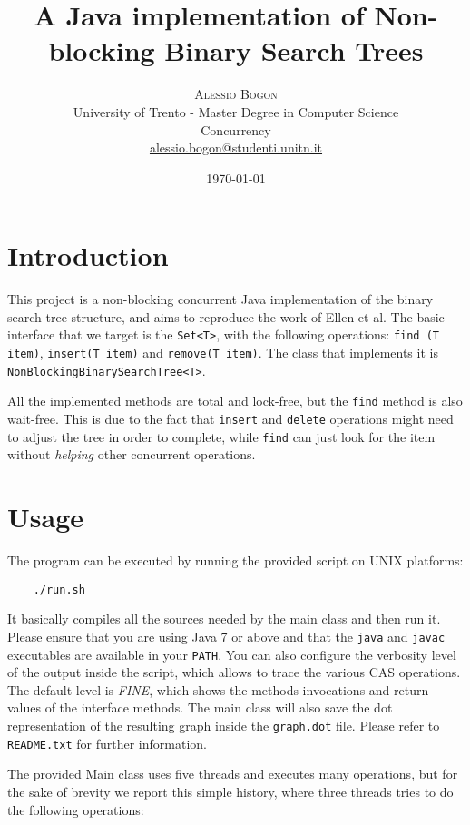 \documentclass[a4paper,draft,12pt]{article}
\title{\textbf{A Java implementation of Non-blocking Binary Search Trees}} %
\author{
    \textsc{Alessio Bogon}\\[2mm] %
    \normalsize University of Trento - Master Degree in Computer Science\\ %
    \normalsize Concurrency\\
    \href{mailto:alessio.bogon@studenti.unitn.it}{alessio.bogon@studenti.unitn.it} %
}
\date{\today}
\begin{document}
\maketitle


\section{Introduction} %
\label{sec:introduction}
This project is a non-blocking concurrent Java implementation of the binary search tree structure, and aims to reproduce the work of Ellen et al\cite{ellen10}.
The basic interface that we target is the \texttt{Set<T>}, with the following operations: \texttt{find (T item)}, \texttt{insert(T item)} and \texttt{remove(T item)}.
The class that implements it is \texttt{Non\-Blocking\-Binary\-Search\-Tree\-<T>}.

All the implemented methods are total and lock-free, but the \texttt{find} method is also wait-free.
This is due to the fact that \texttt{insert} and \texttt{delete} operations might need to adjust the tree in order to complete, while \texttt{find} can just look for the item without \emph{helping} other concurrent operations.



\section{Usage} %
\label{sec:usage}
The program can be executed by running the provided script on UNIX platforms:
\begin{verbatim}
    ./run.sh
\end{verbatim}
It basically compiles all the sources needed by the main class and then run it.
Please ensure that you are using Java 7 or above and that the \texttt{java} and \texttt{javac} executables are available in your \texttt{PATH}.
You can also configure the verbosity level of the output inside the script, which allows to trace the various \ac{CAS} operations.
The default level is \emph{FINE}, which shows the methods invocations and return values of the interface methods.
The main class will also save the dot representation of the resulting graph inside the \texttt{graph.dot} file.
Please refer to \texttt{README.txt} for further information.

The provided Main class uses five threads and executes many operations, but for the sake of brevity we report this simple history, where three threads tries to do the following operations:
\end{document}
